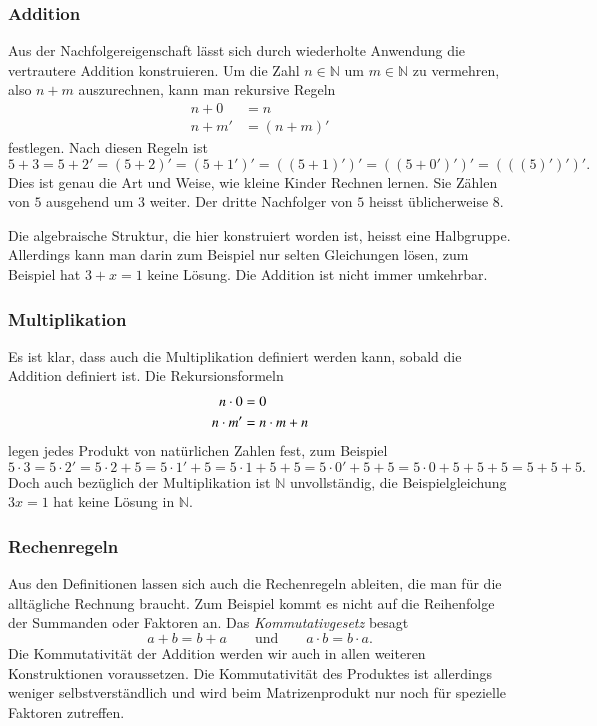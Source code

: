 \subsubsection{Addition}
Aus der Nachfolgereigenschaft lässt sich durch wiederholte Anwendung
die vertrautere Addition konstruieren.
%
Um die Zahl $n\in\mathbb{N}$ um $m\in\mathbb{N}$ zu vermehren, also
$n+m$ auszurechnen, kann man rekursive Regeln
\begin{align*}
n+0&=n\\
n+m'&=(n+m)'
\end{align*}
festlegen.
Nach diesen Regeln ist
\[
5+3
=
5+2'
=
(5+2)'
=
(5+1')'
=
((5+1)')'
=
((5+0')')'
=
(((5)')')'.
\]
Dies ist genau die Art und Weise, wie kleine Kinder Rechnen lernen.
Sie Zählen von $5$ ausgehend um $3$ weiter.
Der dritte Nachfolger von $5$ heisst üblicherweise $8$.

Die algebraische Struktur, die hier konstruiert worden ist, heisst
eine Halbgruppe.
Allerdings kann man darin zum Beispiel nur selten Gleichungen
lösen, zum Beispiel hat $3+x=1$ keine Lösung.
Die Addition ist nicht immer umkehrbar.

\subsubsection{Multiplikation}
Es ist klar, dass auch die Multiplikation definiert werden kann, 
sobald die Addition definiert ist.
Die Rekursionsformeln
\begin{align}
n\cdot 0 &= 0 \notag \\
n\cdot m' &= n\cdot m + n
\label{buch:zahlen:multiplikation-rekursion}
\end{align}
legen jedes Produkt von natürlichen Zahlen fest, zum Beispiel
\[
5\cdot 3
=
5\cdot 2'
=
5\cdot 2 + 5
=
5\cdot 1' + 5
=
5\cdot 1 + 5 + 5
=
5\cdot 0' + 5 + 5
=
5\cdot 0 + 5 + 5 + 5
=
5 + 5 + 5.
\]
Doch auch bezüglich der Multiplikation ist $\mathbb{N}$ unvollständig,
die Beispielgleichung $3x=1$ hat keine Lösung in $\mathbb{N}$.

\subsubsection{Rechenregeln}
Aus den Definitionen lassen sich auch die Rechenregeln ableiten,
die man für die alltägliche Rechnung braucht.
Zum Beispiel kommt es nicht auf die Reihenfolge der Summanden
oder Faktoren an. 
Das {\em Kommutativgesetz} besagt
\[
a+b=b+a
\qquad\text{und}\qquad
a\cdot b = b\cdot a.
\]
%
Die Kommutativität der Addition werden wir auch in allen weiteren
Konstruktionen voraussetzen.
Die Kommutativität des Produktes ist allerdings weniger selbstverständlich
und wird beim Matrizenprodukt nur noch für spezielle Faktoren zutreffen.

